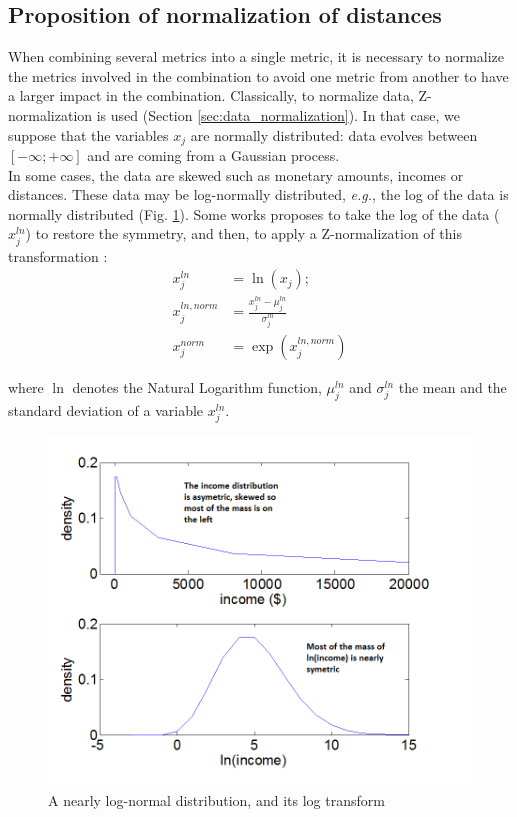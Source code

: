 \newpage
\subsection{Proposition of normalization of distances}
\label{sec:log_normalization}
When combining several metrics into a single metric, it is necessary to normalize the metrics involved in the combination to avoid one metric from another to have a larger impact in the combination. Classically, to normalize data, Z-normalization is used (Section \ref{sec:data_normalization}). In that case, we suppose that the variables $x_j$ are normally distributed: data evolves between $[-\infty;+\infty]$ and are coming from a Gaussian process. \\
In some cases, the data are skewed such as monetary amounts, incomes or distances. These data may be log-normally distributed, \textit{e.g.}, the log of the data is normally distributed (Fig. \ref{fig:SkewedData}). Some works proposes to take the log of the data ($x^{ln}_j$) to restore the symmetry, and then, to apply a Z-normalization of this transformation \cite{Zumel}:
\begin{align}
x^{ln}_j 		& = \ln(x_j); \\
x^{ln,norm}_j & = \frac{x^{ln}_j-\mu^{ln}_j}{\sigma^{ln}_j} \\
x^{norm}_j 	& = \exp(x^{ln,norm}_j)
\end{align}

\noindent where $\ln$ denotes the Natural Logarithm function, $\mu^{ln}_j$ and $\sigma^{ln}_j$ the mean and the standard deviation of a variable $x^{ln}_j$.

\begin{figure}
	\centering
	\includegraphics[width=0.6\linewidth]{images/SkewedData2}
	\caption{A nearly log-normal distribution, and its log transform\protect\footnotemark}
	\label{fig:SkewedData}
\end{figure}



